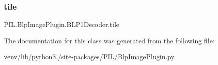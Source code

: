 \mbox{\label{classPIL_1_1BlpImagePlugin_1_1BLP1Decoder_a23c0b2a81dad6e2f97f6ef1af65cb9db}} 
\subsubsection{\texorpdfstring{tile}{tile}}
{\footnotesize\ttfamily P\+I\+L.\+Blp\+Image\+Plugin.\+B\+L\+P1\+Decoder.\+tile}



The documentation for this class was generated from the following file\+:\begin{DoxyCompactItemize}
\item 
venv/lib/python3./site-\/packages/\+P\+I\+L/\hyperlink{BlpImagePlugin_8py}{Blp\+Image\+Plugin.\+py}\end{DoxyCompactItemize}
